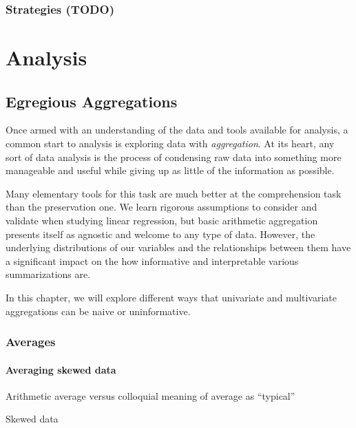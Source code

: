 \documentclass[
]{krantz}
\begin{document}
\hypertarget{strategies-todo-1}{%
\section{Strategies (TODO)}\label{strategies-todo-1}}

\hypertarget{part-analysis}{%
\part*{Analysis}\label{part-analysis}}


\hypertarget{eg-agg}{%
\chapter{Egregious Aggregations}\label{eg-agg}}

Once armed with an understanding of the data and tools available for analysis, a common start to analysis is exploring data with \emph{aggregation}.
At its heart, any sort of data analysis is the process of condensing raw data into something more manageable and useful while giving up as little of the information as possible.

Many elementary tools for this task are much better at the comprehension task than the preservation one.
We learn rigorous assumptions to consider and validate when studying linear regression, but basic arithmetic aggregation presents itself as agnostic and welcome to any type of data.
However, the underlying distributions of our variables and the relationships between them have a significant impact on the how informative and interpretable various summarizations are.

In this chapter, we will explore different ways that univariate and multivariate aggregations can be naive or uninformative.

\hypertarget{averages}{%
\section{Averages}\label{averages}}

\hypertarget{averaging-skewed-data}{%
\subsection{Averaging skewed data}\label{averaging-skewed-data}}

Arithmetic average versus colloquial meaning of average as ``typical''

Skewed data
\end{document}
